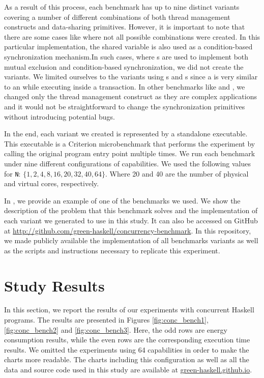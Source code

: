 As a result of this process, each benchmark has up to nine distinct variants covering a number of different combinations of both thread management constructs and data-sharing primitives. However, it is important to note that there are some cases like \dining where not all possible combinations were created. In this particular implementation, the shared variable is also used as a condition-based synchronization mechanism.In such cases, where {\MVar}s are used to implement both mutual exclusion and condition-based synchronization, we did not create the \TVar variants. We limited ourselves to the variants using {\MVar}s and {\TMVar}s since a \TMVar is very similar to an \MVar while executing inside a transaction. In other benchmarks like \tsearch and \warp, we changed only the thread management construct as they are complex applications and it would not be straightforward to change the synchronization primitives without introducing potential bugs.

In the end, each variant we created is represented by a standalone executable. This executable is a Criterion microbenchmark that performs the experiment by calling the original program entry point multiple times. We run each benchmark under nine different configurations of capabilities. We used the following values for \texttt{N}: $\{1, 2, 4, 8, 16, 20, 32, 40, 64\}$. Where 20 and 40 are the number of physical and virtual cores, respectively.

In , we provide an example of one of the benchmarks we used. We show the description of the problem that this benchmark solves and the implementation of each variant we generated to use in this study. It can also be accessed on GitHub at \url{http://github.com/green-haskell/concurrency-benchmark}. In this repository, we made publicly available the implementation of all benchmarks variants as well as the scripts and instructions necessary to replicate this experiment.


\section{Study Results}\label{sec:results}
In this section, we report the results of our experiments with concurrent Haskell programs. The results are presented in Figures \ref{fig:conc_bench1}, \ref{fig:conc_bench2} and \ref{fig:conc_bench3}. Here, the odd rows are energy consumption results, while the even rows are the corresponding execution time results. We omitted the experiments using 64 capabilities in order to make the charts more readable. The charts including this configuration as well as all the data and source code used in this study are available at \href{http://green-haskell.github.io/}{green-haskell.github.io}.
\newline

